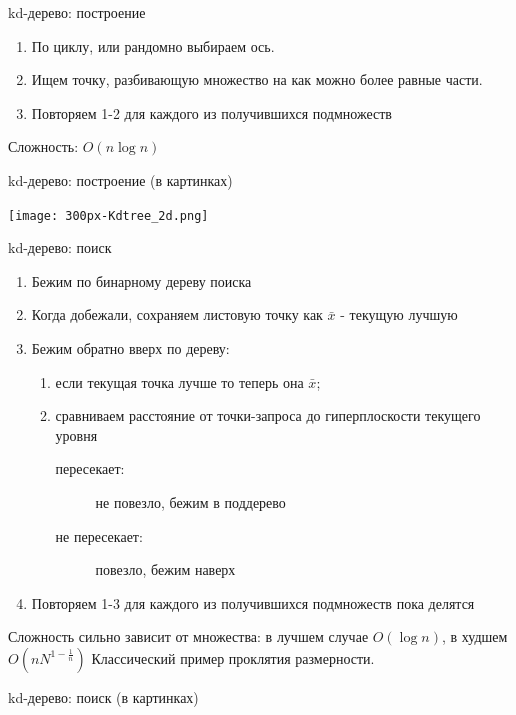 \documentclass[14pt, fleqn, xcolor={dvipsnames, table}]{beamer}
\begin{document}
\begin{frame}{kd-дерево: построение}
\begin{enumerate}
  \item По циклу, или рандомно выбираем ось.
  \item Ищем точку, разбивающую множество на как можно более равные части.
  \item Повторяем 1-2 для каждого из получившихся подмножеств
\end{enumerate}
Сложность: $O(n \log n)$
\end{frame}

\begin{frame}{kd-дерево: построение (в картинках)}
\begin{center}
\texttt{[image: 300px-Kdtree\_2d.png]}
\end{center}
\end{frame}

\begin{frame}{kd-дерево: поиск}
\begin{enumerate}
  \item Бежим по бинарному дереву поиска
  \item Когда добежали, сохраняем листовую точку как $\bar{x}$ - текущую лучшую
  \item Бежим обратно вверх по дереву:
  \begin{enumerate}
    \item если текущая точка лучше то теперь она $\bar{x}$;
    \item сравниваем расстояние от точки-запроса до гиперплоскости текущего уровня
    \begin{description}
      \item [\color{blue}пересекает:] не повезло, бежим в поддерево
      \item [\color{blue}не пересекает:] повезло, бежим наверх  
    \end{description}
  \end{enumerate}
  \item Повторяем 1-3 для каждого из получившихся подмножеств пока делятся
\end{enumerate}
Сложность сильно зависит от множества: в лучшем случае $O(\log n)$, в худшем $O(nN^{1-\frac{1}{n}})$ Классический пример проклятия размерности.
\end{frame}

\begin{frame}{kd-дерево: поиск (в картинках)}
\begin{center}
\end{center}
\end{frame}
\end{document}
